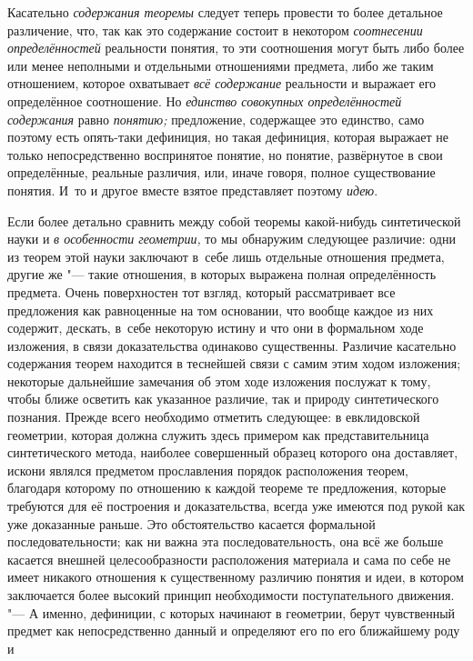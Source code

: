 Касательно {\em содержания
теоремы} следует теперь провести то более детальное
различение, что, так как это содержание состоит в некотором
{\em соотнесении определённостей}
реальности понятия, то эти соотношения могут быть либо более
или менее неполными и отдельными отношениями предмета, либо же таким
отношением, которое охватывает {\em всё
содержание} реальности и выражает его определённое
соотношение. Но {\em единство совокупных
определённостей содержания} равно
{\em понятию;}
предложение, содержащее это единство, само поэтому есть
опять-таки дефиниция, но такая дефиниция, которая выражает не только
непосредственно воспринятое понятие, но понятие, развёрнутое в свои
определённые, реальные различия, или, иначе говоря, полное существование
понятия. И~то и другое вместе взятое представляет поэтому
{\em идею}.

Если более детально сравнить между собой теоремы какой-нибудь
синтетической науки и {\em в особенности
геометрии,} то мы обнаружим следующее различие: одни из
теорем этой науки заключают в~себе лишь отдельные отношения предмета,
другие же "--- такие отношения, в которых выражена полная
определённость предмета. Очень поверхностен тот взгляд, который
рассматривает все предложения как равноценные на том основании, что вообще
каждое из них содержит, дескать, в~себе некоторую истину и что они в
формальном ходе изложения, в связи доказательства одинаково существенны.
Различие касательно содержания теорем находится в теснейшей связи с самим
этим ходом изложения; некоторые дальнейшие замечания об этом ходе изложения
послужат к тому, чтобы ближе осветить как указанное
различие, так и природу синтетического познания. Прежде всего необходимо
отметить следующее: в евклидовской геометрии, которая должна служить здесь
примером как представительница синтетического метода, наиболее совершенный
образец которого она доставляет, искони являлся предметом прославления
порядок расположения теорем, благодаря которому по отношению к каждой
теореме те предложения, которые требуются для её построения и
доказательства, всегда уже имеются под рукой как уже доказанные раньше. Это
обстоятельство касается формальной последовательности; как ни важна эта
последовательность, она всё же больше касается внешней целесообразности
расположения материала и сама по себе не имеет никакого отношения к
существенному различию понятия и идеи, в котором заключается более высокий
принцип необходимости поступательного движения. "--- А именно,
дефиниции, с которых начинают в геометрии, берут чувственный предмет как
непосредственно данный и определяют его по его ближайшему роду и
